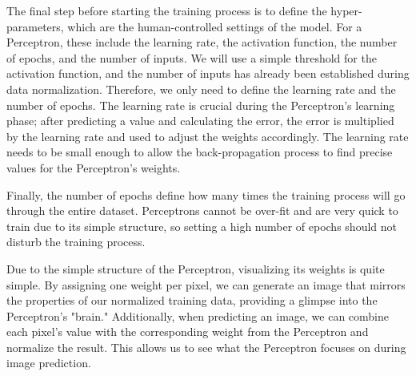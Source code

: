 \documentclass{article}
\begin{document}
The final step before starting the training process is to define the hyper-parameters, which are the human-controlled settings of the model. For a Perceptron, these include the learning rate, the activation function, the number of epochs, and the number of inputs. We will use a simple threshold for the activation function, and the number of inputs has already been established during data normalization. Therefore, we only need to define the learning rate and the number of epochs. The learning rate is crucial during the Perceptron's learning phase; after predicting a value and calculating the error, the error is multiplied by the learning rate and used to adjust the weights accordingly. The learning rate needs to be small enough to allow the back-propagation process to find precise values for the Perceptron's weights. 

Finally, the number of epochs define how many times the training process will go through the entire dataset. Perceptrons cannot be over-fit and are very quick to train due to its simple structure, so setting a high number of epochs should not disturb the training process.

Due to the simple structure of the Perceptron, visualizing its weights is quite simple. By assigning one weight per pixel, we can generate an image that mirrors the properties of our normalized training data, providing a glimpse into the Perceptron's "brain." Additionally, when predicting an image, we can combine each pixel's value with the corresponding weight from the Perceptron and normalize the result. This allows us to see what the Perceptron focuses on during image prediction.
\end{document}
